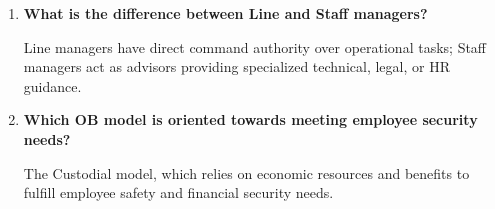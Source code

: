 \documentclass[11pt,a4paper]{article}
\newcommand{\Q}[1]{\textbf{#1}\par\noindent\ignorespaces}
\begin{document}
\begin{tcolorbox}[exambox, title={\textbf{Frequently Asked / Viva Questions}}]
\begin{enumerate}[leftmargin=*, itemsep=4pt]
  \item \Q{What is the difference between Line and Staff managers?}
    Line managers have direct command authority over operational tasks; Staff managers act as advisors providing specialized technical, legal, or HR guidance.
  
  \item \Q{Which OB model is oriented towards meeting employee security needs?}
    The Custodial model, which relies on economic resources and benefits to fulfill employee safety and financial security needs.
\end{enumerate}
\end{tcolorbox}
\end{document}
